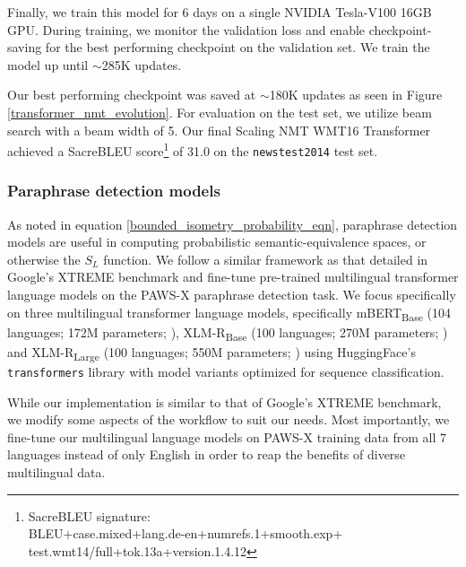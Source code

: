 \documentclass[11pt,a4paper]{article}
\begin{document}
Finally, we train this model for 6 days on a single NVIDIA Tesla-V100 16GB GPU. During training, we monitor the validation loss and enable checkpoint-saving for the best performing checkpoint on the validation set. We train the model up until $\sim$285K updates.

Our best performing checkpoint was saved at $\sim$180K updates as seen in Figure \ref{transformer_nmt_evolution}. For evaluation on the test set, we utilize beam search with a beam width of 5. Our final Scaling NMT WMT16 Transformer achieved a SacreBLEU \cite{post-2018-call} score\footnote{\footnotesize SacreBLEU signature:\\BLEU+case.mixed+lang.de\nobreakdash-en+numrefs.1+smooth.exp+\\test.wmt14/full+tok.13a+version.1.4.12} of 31.0 on the \texttt{newstest2014} test set.

\subsubsection{Paraphrase detection models}

As noted in equation \ref{bounded_isometry_probability_eqn}, paraphrase detection models are useful in computing probabilistic semantic-equivalence spaces, or otherwise the $S_L$ function. We follow a similar framework as that detailed in Google's XTREME benchmark \cite{hu2020xtreme} and fine-tune pre-trained multilingual transformer language models on the PAWS-X paraphrase detection task. We focus specifically on three multilingual transformer language models, specifically mBERT\textsubscript{Base} (104 languages; 172M parameters; \citealt{devlin-etal-2019-bert}), XLM-R\textsubscript{Base} (100 languages; 270M parameters; \citealt{conneau2019unsupervised}) and XLM-R\textsubscript{Large} (100 languages; 550M parameters; \citealt{conneau2019unsupervised}) using HuggingFace's \texttt{transformers} library \cite{Wolf2019HuggingFacesTS} with model variants optimized for sequence classification.

While our implementation is similar to that of Google's XTREME benchmark, we modify some aspects of the workflow to suit our needs. Most importantly, we fine-tune our multilingual language models on PAWS-X training data from all 7 languages instead of only English in order to reap the benefits of diverse multilingual data.
\end{document}
